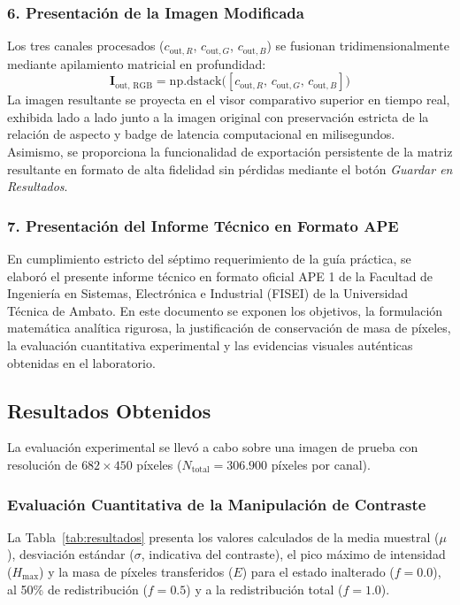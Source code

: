 \documentclass{article}
\begin{document}
\subsubsection{6. Presentación de la Imagen Modificada}
Los tres canales procesados ($c_{\text{out}, R}$, $c_{\text{out}, G}$, $c_{\text{out}, B}$) se fusionan tridimensionalmente mediante apilamiento matricial en profundidad:
\begin{equation}
    \mathbf{I}_{\text{out, RGB}} = \text{np.dstack}\big([c_{\text{out}, R},\, c_{\text{out}, G},\, c_{\text{out}, B}]\big)
\end{equation}
La imagen resultante se proyecta en el visor comparativo superior en tiempo real, exhibida lado a lado junto a la imagen original con preservación estricta de la relación de aspecto y badge de latencia computacional en milisegundos. Asimismo, se proporciona la funcionalidad de exportación persistente de la matriz resultante en formato de alta fidelidad sin pérdidas mediante el botón \textit{Guardar en Resultados}.

\subsubsection{7. Presentación del Informe Técnico en Formato APE}
En cumplimiento estricto del séptimo requerimiento de la guía práctica, se elaboró el presente informe técnico en formato oficial APE 1 de la Facultad de Ingeniería en Sistemas, Electrónica e Industrial (FISEI) de la Universidad Técnica de Ambato. En este documento se exponen los objetivos, la formulación matemática analítica rigurosa, la justificación de conservación de masa de píxeles, la evaluación cuantitativa experimental y las evidencias visuales auténticas obtenidas en el laboratorio.


\subsection{Resultados Obtenidos}

La evaluación experimental se llevó a cabo sobre una imagen de prueba con resolución de $682 \times 450$ píxeles ($N_{\text{total}} = 306.900$ píxeles por canal).

\subsubsection{Evaluación Cuantitativa de la Manipulación de Contraste}
La Tabla~\ref{tab:resultados} presenta los valores calculados de la media muestral ($\mu$), desviación estándar ($\sigma$, indicativa del contraste), el pico máximo de intensidad ($H_{\max}$) y la masa de píxeles transferidos ($E$) para el estado inalterado ($f = 0.0$), al 50\% de redistribución ($f = 0.5$) y a la redistribución total ($f = 1.0$).
\end{document}
